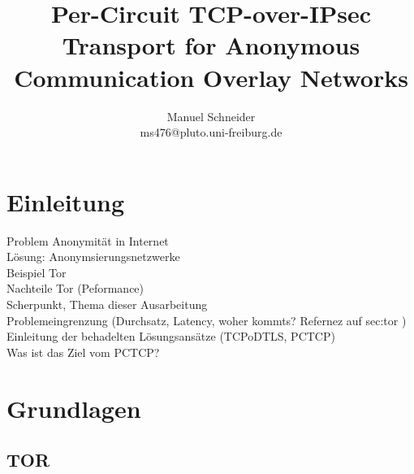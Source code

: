 \documentclass[fleqn,envcountsame,runningheads,10pt,a4paper]{llncs}
\begin{document}
\title{Per-Circuit TCP-over-IPsec Transport for Anonymous Communication Overlay Networks} 
\titlerunning{}
\author{Manuel Schneider\\ms476@pluto.uni-freiburg.de}
\authorrunning{}
\maketitle

\section{Einleitung}
\label{sec:intro}

Problem Anonymität in Internet\\
Lösung: Anonymsierungsnetzwerke\\
Beispiel Tor\\
Nachteile Tor (Peformance)\\
Scherpunkt, Thema dieser Ausarbeitung\\
Problemeingrenzung (Durchsatz, Latency, woher kommts? Refernez auf sec:tor ) \\
Einleitung der behadelten Lösungsansätze (TCPoDTLS, PCTCP)\\
Was ist das Ziel vom PCTCP? \\



\section{Grundlagen}
\label{sec:basics}

\subsection{TOR}
\label{sec:tor}
\end{document}
